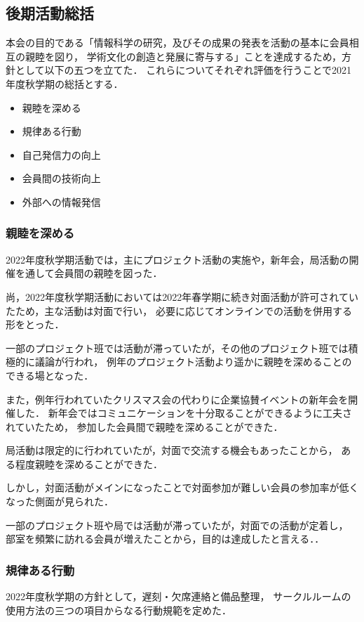 \subsection*{後期活動総括}


本会の目的である「情報科学の研究，及びその成果の発表を活動の基本に会員相互の親睦を図り，
学術文化の創造と発展に寄与する」ことを達成するため，方針として以下の五つを立てた．
これらについてそれぞれ評価を行うことで2021年度秋学期の総括とする．

\begin{itemize}
    \item 親睦を深める
    \item 規律ある行動
    \item 自己発信力の向上
    \item 会員間の技術向上
    \item 外部への情報発信
\end{itemize}

\subsubsection*{親睦を深める}
    2022年度秋学期活動では，主にプロジェクト活動の実施や，新年会，局活動の開催を通して会員間の親睦を図った．

    尚，2022年度秋学期活動においては2022年春学期に続き対面活動が許可されていたため，主な活動は対面で行い，
    必要に応じてオンラインでの活動を併用する形をとった．

    一部のプロジェクト班では活動が滞っていたが，その他のプロジェクト班では積極的に議論が行われ，
    例年のプロジェクト活動より遥かに親睦を深めることのできる場となった．

    また，例年行われていたクリスマス会の代わりに企業協賛イベントの新年会を開催した．
    新年会ではコミュニケーションを十分取ることができるように工夫されていたため，
    参加した会員間で親睦を深めることができた．
    
    局活動は限定的に行われていたが，対面で交流する機会もあったことから，
    ある程度親睦を深めることができた．
    
    しかし，対面活動がメインになったことで対面参加が難しい会員の参加率が低くなった側面が見られた．

    一部のプロジェクト班や局では活動が滞っていたが，対面での活動が定着し，
    部室を頻繁に訪れる会員が増えたことから，目的は達成したと言える．．

\subsubsection*{規律ある行動}
    2022年度秋学期の方針として，遅刻・欠席連絡と備品整理，
    サークルルームの使用方法の三つの項目からなる行動規範を定めた．
    
